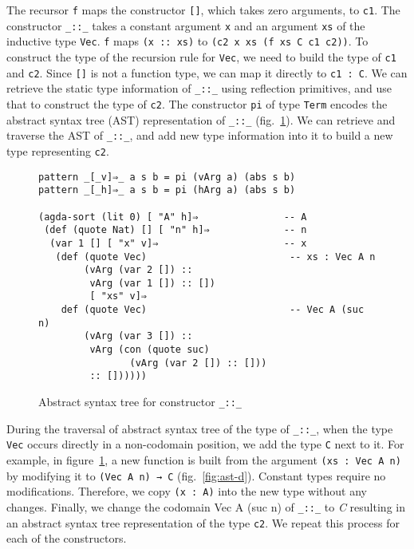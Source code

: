 \documentclass[sigplan,10pt]{acmart}
\begin{document}

The recursor {\tt f} maps the constructor {\tt []}, which takes zero arguments, to {\tt c1}. The constructor {\tt \_::\_} takes a constant argument {\tt x} and an argument {\tt xs} of the inductive type {\tt Vec}. {\tt f} maps {\tt (x :: xs)} to {\tt (c2 x xs (f xs C c1 c2))}. To construct the type of the recursion rule for {\tt Vec}, we need to build the type of {\tt c1} and {\tt c2}. Since {\tt []} is not a function type, we can map it directly to {\tt c1 : C}. We can retrieve the static type information of {\tt \_::\_} using reflection primitives, and use that to construct the type of {\tt c2}. The constructor {\tt pi} of type {\tt Term} encodes the abstract syntax tree (AST) representation of {\tt \_::\_} (fig.~\ref{fig:ast-g}). We can retrieve and traverse the AST of {\tt \_::\_}, and add new type information into it to build a new type representing {\tt c2}.

\begin{figure}
\begin{center}
\begingroup
\fontsize{7pt}{9pt}\selectfont
\begin{Verbatim}[frame = single]
pattern _[_v]⇒_ a s b = pi (vArg a) (abs s b)
pattern _[_h]⇒_ a s b = pi (hArg a) (abs s b)

(agda-sort (lit 0) [ "A" h]⇒               -- A
 (def (quote Nat) [] [ "n" h]⇒             -- n
  (var 1 [] [ "x" v]⇒                      -- x
   (def (quote Vec)                         -- xs : Vec A n
        (vArg (var 2 []) ::
         vArg (var 1 []) :: [])
         [ "xs" v]⇒
    def (quote Vec)                         -- Vec A (suc n)
        (vArg (var 3 []) ::
         vArg (con (quote suc)
                (vArg (var 2 []) :: []))
         :: [])))))
\end{Verbatim}
\endgroup
\end{center}
\caption{Abstract syntax tree for constructor {\tt \_::\_}}
\label{fig:ast-g}
\end{figure}

\normalsize

During the traversal of abstract syntax tree of the type of {\tt \_::\_}, when the type {\tt Vec} occurs directly in a non-codomain position, we add the type {\tt C} next to it. For example, in figure~\ref{fig:ast-g}, a new function is built from the argument {\tt (xs : Vec A n)} by modifying it to {\tt (Vec A n) → C} (fig.~\ref{fig:ast-d}). Constant types require no modifications. Therefore, we copy {\tt (x : A)} into the new type without any changes. Finally, we change the codomain {Vec A (suc n)} of {\tt \_::\_} to \emph{C} resulting in an abstract syntax tree representation of the type {\tt c2}. We repeat this process for each of the constructors.
\end{document}
